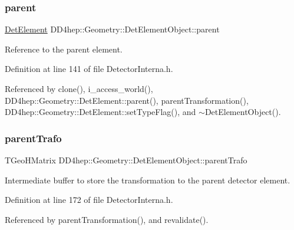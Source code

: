 \subsubsection{\texorpdfstring{parent}{parent}}
{\footnotesize\ttfamily \hyperlink{class_d_d4hep_1_1_geometry_1_1_det_element}{Det\+Element} D\+D4hep\+::\+Geometry\+::\+Det\+Element\+Object\+::parent}



Reference to the parent element. 



Definition at line 141 of file Detector\+Interna.\+h.



Referenced by clone(), i\+\_\+access\+\_\+world(), D\+D4hep\+::\+Geometry\+::\+Det\+Element\+::parent(), parent\+Transformation(), D\+D4hep\+::\+Geometry\+::\+Det\+Element\+::set\+Type\+Flag(), and $\sim$\+Det\+Element\+Object().

\hypertarget{class_d_d4hep_1_1_geometry_1_1_det_element_object_a3d0d575da80e9a118c5e36f53e265339}{}\label{class_d_d4hep_1_1_geometry_1_1_det_element_object_a3d0d575da80e9a118c5e36f53e265339} 
\subsubsection{\texorpdfstring{parent\+Trafo}{parentTrafo}}
{\footnotesize\ttfamily T\+Geo\+H\+Matrix D\+D4hep\+::\+Geometry\+::\+Det\+Element\+Object\+::parent\+Trafo}



Intermediate buffer to store the transformation to the parent detector element. 



Definition at line 172 of file Detector\+Interna.\+h.



Referenced by parent\+Transformation(), and revalidate().

\hypertarget{class_d_d4hep_1_1_geometry_1_1_det_element_object_a6346cce7b6b1f96a5f33a41f2f9e219f}{}\label{class_d_d4hep_1_1_geometry_1_1_det_element_object_a6346cce7b6b1f96a5f33a41f2f9e219f} 

